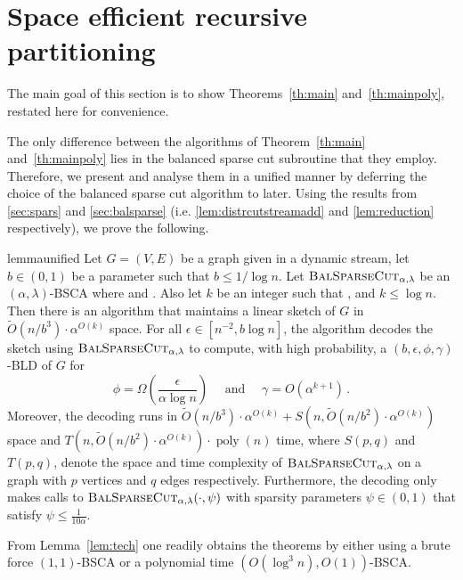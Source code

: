 \documentclass[epsfig,letter,11pt]{article}
\numberwithin{equation}{section}
\newcommand{\otil}{\tilde{O}}
\newcommand{\bsc}{\textsc{BalSparseCut}_{\alpha,\lambda}}
\renewcommand{\tilde}{\widetilde}
\DeclareMathOperator*{\poly}{poly}
\begin{document}
\section{Space efficient recursive partitioning}
\label{sec:algexpdec}

\noindent
The main goal of this section is to show Theorems~\ref{th:main} and~\ref{th:mainpoly}, restated here for convenience.

\mainbld*
\mainbldpoly*
\noindent
The only difference between the algorithms of Theorem~\ref{th:main} and~\ref{th:mainpoly} lies in the balanced sparse cut subroutine that they employ. Therefore, we present and analyse them in a unified manner by deferring the choice of the balanced sparse cut algorithm to later. Using the results from \cref{sec:spars} and \cref{sec:balsparse} (i.e. \cref{lem:distrcutstreamadd} and \cref{lem:reduction} respectively), we prove the following.


\begin{restatable}{lemma}{unified}
	\label{lem:tech}
	Let $G=(V,E)$ be a graph given in a dynamic stream, let $b \in (0,1)$ be a parameter such that $b \le {1}/{\log n}$. Let $\bsc$ be an $(\alpha,\lambda)$-BSCA where  and . Also let $k$ be an integer such that , and $k \le \log n$. Then there is an algorithm that maintains a linear sketch of $G$ in $\otil( n/b^3) \cdot \alpha^{O(k)}$ space. For all $\epsilon \in [n^{-2},b\log n]$, the algorithm decodes the sketch using $\bsc$ to compute, with high probability, a $(b,\epsilon,\phi,\gamma)$-BLD of $G$ for
	\begin{equation*}
		\phi = \Omega\left(\frac{\epsilon}{\alpha \log n}\right) \quad \text{ and } \quad \gamma = O(\alpha^{k+1}) \, .
	\end{equation*}
	Moreover, the decoding runs in $\otil( n/b^3) \cdot \alpha^{O(k)}+S(n,\otil( n/b^2) \cdot \alpha^{O(k)})$ space and  {$T(n,\otil( n/b^2) \cdot \alpha^{O(k)}) \cdot \poly(n) $} time, where $S(p,q)$ and $T(p,q)$, denote the space and time complexity of $\bsc$ on a graph with $p$ vertices and $q$ edges respectively. Furthermore, the decoding only makes calls to $\bsc(\cdot, \psi)$ with sparsity parameters $\psi \in (0,1)$ that satisfy $\psi \le \frac{1}{10\alpha}$.
\end{restatable}

\noindent
From Lemma~\ref{lem:tech} one readily obtains the theorems by either using a brute force $(1,1)$-BSCA or a polynomial time $(O(\log^3 n), O(1))$-BSCA.
\end{document}
